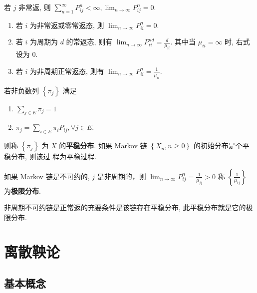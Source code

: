 \documentclass[10pt]{yerbaformat}
\begin{document}
\begin{corollary}
    若 $j$ 非常返, 则 $\sum_{n=1}^{\infty} P_{i j}^{n}<\infty, \lim _{n \rightarrow \infty} P_{i j}^{n}=0 .$
\end{corollary}

\begin{theorem}[基本极限定理]
    \begin{enumerate}
        \item 若 $i$ 为非常返或零常返态, 则 $\lim _{n \rightarrow \infty} P_{i i}^{n}=0 .$
        \item 若 $i$ 为周期为 $d$ 的常返态, 则有 $\lim _{n \rightarrow \infty} P_{i i}^{n d}=\frac{d}{\mu_{i i}}$.
              其中当 $\mu_{i i}=\infty$ 时, 右式设为 $0 .$
        \item 若 $i$ 为非周期正常返态, 则有 $\lim _{n \rightarrow \infty} P_{i i}^{n}=\frac{1}{\mu_{i i}}$.
    \end{enumerate}
\end{theorem}

\begin{definition}[平稳分布]
    若非负数列 $\left\{\pi_{j}\right\}$ 满足
    \begin{enumerate}
        \item $\sum_{j \in E} \pi_{j}=1$
        \item $\pi_{j}=\sum_{i \in E} \pi_{i} P_{i j}, \forall j \in E$.
    \end{enumerate}
    则称 $\left\{\pi_{j}\right\}$ 为 $X$ 的\textbf{平稳分布}. 如果 Markov 链 $\left\{X_{n}, n \geq 0\right\}$ 的初始分布是个平稳分布, 则该过
    程为平稳过程.
\end{definition}

\begin{lemma}
    如果 Markov 链是不可约的, $j$ 是非周期的，则 $\lim _{n \rightarrow \infty} P_{i j}^{n}=\frac{1}{\mu_{j j}}>0$ 称 $\left\{\frac{1}{\mu_{i j}}\right\}$ 为\textbf{极限分布}.
\end{lemma}

\begin{theorem}
    非周期不可约链是正常返的充要条件是该链存在平稳分布, 此平稳分布就是它的极限分布.
\end{theorem}

\section{离散鞅论}
\subsection{基本概念}
\end{document}
